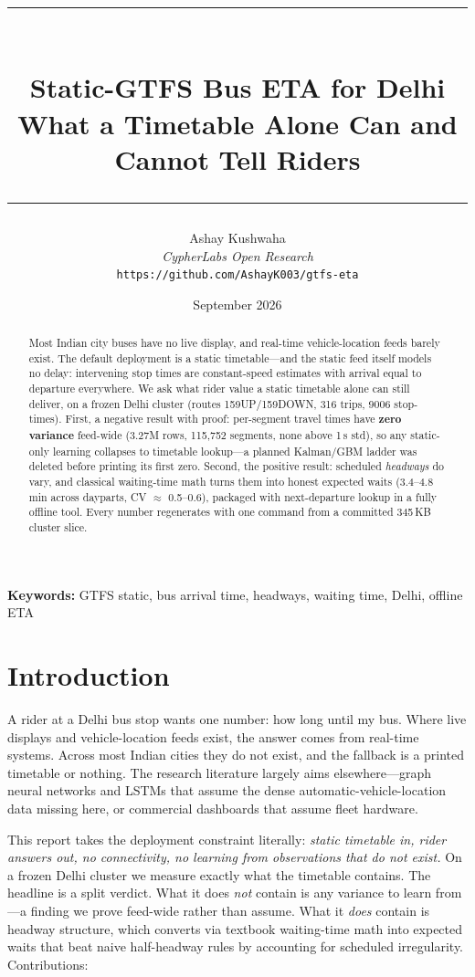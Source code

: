 \documentclass[11pt,a4paper]{article}
\title{
    \vspace{-2em}
    \rule{\textwidth}{1pt}\\[0.5em]
    \textbf{Static-GTFS Bus ETA for Delhi}\\[0.3em]
    \large What a Timetable Alone Can and Cannot Tell Riders\\[0.5em]
    \rule{\textwidth}{1pt}
}
\author{
    Ashay Kushwaha\\
    \textit{CypherLabs Open Research}\\
    \texttt{https://github.com/AshayK003/gtfs-eta}
}
\date{September 2026}
\begin{document}
\maketitle

\begin{abstract}
Most Indian city buses have no live display, and real-time vehicle-location feeds barely exist. The default deployment is a static timetable---and the static feed itself models no delay: intervening stop times are constant-speed estimates with arrival equal to departure everywhere. We ask what rider value a static timetable alone can still deliver, on a frozen Delhi cluster (routes 159UP/159DOWN, 316 trips, 9006 stop-times). First, a negative result with proof: per-segment travel times have \textbf{zero variance} feed-wide (3.27M rows, 115,752 segments, none above 1\,s std), so any static-only learning collapses to timetable lookup---a planned Kalman/GBM ladder was deleted before printing its first zero. Second, the positive result: scheduled \textit{headways} do vary, and classical waiting-time math turns them into honest expected waits (3.4--4.8\,min across dayparts, CV $\approx$ 0.5--0.6), packaged with next-departure lookup in a fully offline tool. Every number regenerates with one command from a committed 345\,KB cluster slice.
\end{abstract}

\vspace{1em}
\noindent\textbf{Keywords:} GTFS static, bus arrival time, headways, waiting time, Delhi, offline ETA

\newpage
\tableofcontents
\newpage

\section{Introduction}

A rider at a Delhi bus stop wants one number: how long until my bus. Where live displays and vehicle-location feeds exist, the answer comes from real-time systems. Across most Indian cities they do not exist, and the fallback is a printed timetable or nothing. The research literature largely aims elsewhere---graph neural networks and LSTMs that assume the dense automatic-vehicle-location data missing here, or commercial dashboards that assume fleet hardware.

This report takes the deployment constraint literally: \textit{static timetable in, rider answers out, no connectivity, no learning from observations that do not exist.} On a frozen Delhi cluster we measure exactly what the timetable contains. The headline is a split verdict. What it does \textit{not} contain is any variance to learn from---a finding we prove feed-wide rather than assume. What it \textit{does} contain is headway structure, which converts via textbook waiting-time math into expected waits that beat naive half-headway rules by accounting for scheduled irregularity. Contributions:
\end{document}

